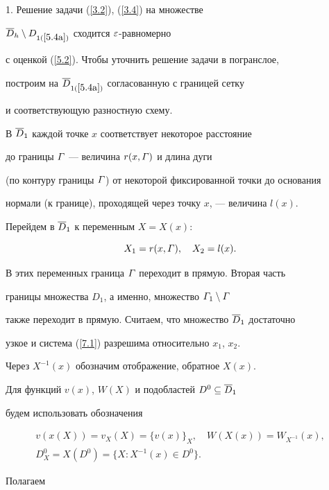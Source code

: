 1. Решение задачи  (\ref{3.2}), (\ref{3.4}) на множестве


$\overline{D}_h\setminus D_{1(\ref{5.4a})}$ сходится $\varepsilon$-равномерно


с оценкой (\ref{5.2}). Чтобы уточнить решение задачи в погранслое,


построим на $\overline{D}_{1(\ref{5.4a})}$ согласованную с границей сетку


и соответствующую разностную схему.





В $\overline{D}_1$ каждой точке $x$ соответствует некоторое расстояние


до границы $\varGamma$ --- величина $r(x,\varGamma)$  и длина дуги


(по контуру границы $\varGamma$) от некоторой фиксированной точки до основания


нормали (к границе), проходящей через точку $x$, --- величина $l(x)$.


Перейдем в $\overline{D}_1$ к переменным $X=X(x)$:


\begin{equation} \label{7.1}


X_1=r(x,\G), \quad X_2=l(x).


\end{equation}


В этих переменных граница $\varGamma$ переходит в прямую. Вторая часть


границы множества $D_1$, а именно, множество $\varGamma_1\setminus \varGamma$


также переходит в прямую. Считаем, что множество $\overline{D}_1$ достаточно


узкое и система (\ref{7.1}) разрешима относительно $x_1$, $x_2$.


Через $X^{-1}(x)$ обозначим отображение, обратное $X(x)$.





Для функций $v(x)$, $W(X)$ и подобластей $D^0\subseteq \overline{D}_1$


будем использовать обозначения


\begin{gather*}


v(x(X))=v_X(X)=\{v(x)\}_X, \quad W(X(x))=W_{X^{-1}}(x), \\


D^0_X=X(D^0)=\{X: X^{-1}(x)\in D^0\}.


\end{gather*}


Полагаем


